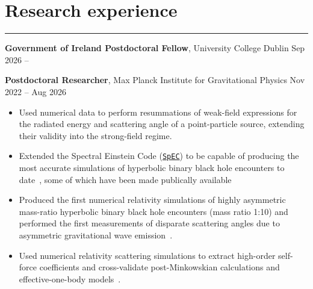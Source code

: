 \documentclass[10.5pt, oneside]{article}   	%
\begin{document}
 
 
\begin{center}
\huge
\href{mailto:oliver.long@ucd.ie}{} \:
\textcolor{Orcidcolour}{\href{https://orcid.org/0000-0002-3897-9272}{}} \:
\textcolor{RGcolour}{\href{https://www.researchgate.net/profile/Oliver-Long-3}{}} \:
\textcolor{LIcolour}{\href{https://www.linkedin.com/in/oliverflong/}{}} \:
\href{https://scholar.google.com/citations?user=92pSUO0AAAAJ&hl=en}{} \:
\href{https://oliverlong.info}{}
\end{center}

 \vspace{1mm}


{\color{Sectioncolour}
\section*{Research experience} 
\vspace{-3mm}
\noindent\rule{\linewidth}{0.6pt}}

\textbf{Government of Ireland Postdoctoral Fellow}, University College Dublin \hfill Sep 2026 -- \\
\vspace{-3mm}

\textbf{Postdoctoral Researcher}, Max Planck Institute for Gravitational Physics \hfill Nov 2022 -- Aug 2026\\
\vspace{-5mm}
\begin{itemize}
\item Used numerical data to perform resummations of weak-field expressions for the radiated energy \cite{Barack:2026izc} and scattering angle \cite{Long:2024ltn} of a point-particle source, extending their validity into the strong-field regime.
\item Extended the Spectral Einstein Code (\href{https://www.black-holes.org/for-researchers/spec}{\texttt{SpEC}}) to be capable of producing the most accurate simulations of hyperbolic binary black hole encounters to date~\cite{Long:2025nmj,Mendes:2025gov}, some of which have been made publically available~\cite{Scheel:2025jct}
\item Produced the first numerical relativity simulations of highly asymmetric mass-ratio hyperbolic binary black hole encounters (mass ratio 1:10) and performed the first measurements of disparate scattering angles due to asymmetric gravitational wave emission~\cite{Long:2025nmj}.
\item Used numerical relativity scattering simulations to extract high-order self-force coefficients and cross-validate post-Minkowskian calculations and effective-one-body models~\cite{Long:2025nmj,Long:2025tvk}.
\end{itemize}
\end{document}
